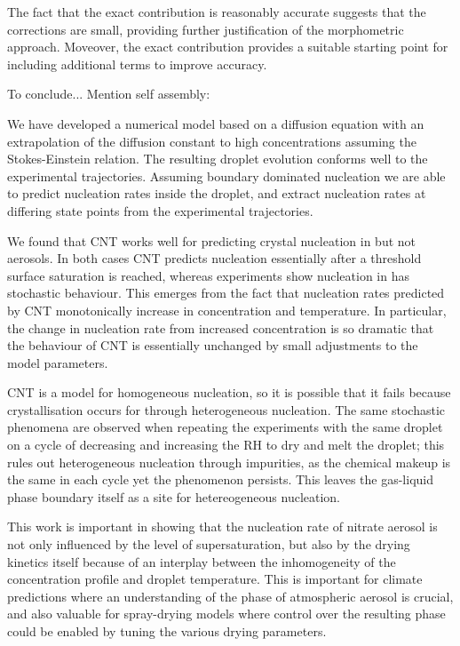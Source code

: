 \documentclass[11pt,twoside]{report}
\def\includebibliography{}
\begin{document}
The fact that the exact contribution is reasonably accurate suggests that the corrections are small, providing further justification of the morphometric approach.
Moveover, the exact contribution provides a suitable starting point for including additional terms to improve accuracy.

To conclude...
Mention self assembly: \cite{TeichNC2019}

We have developed a numerical model based on a diffusion equation with an extrapolation of the diffusion constant to high concentrations assuming the Stokes-Einstein relation.
The resulting droplet evolution conforms well to the experimental trajectories.
Assuming boundary dominated nucleation we are able to predict nucleation rates inside the droplet, and extract nucleation rates at differing state points from the experimental trajectories.

We found that CNT works well for predicting crystal nucleation in  but not  aerosols.
In both cases CNT predicts nucleation essentially after a threshold surface saturation is reached, whereas experiments show nucleation in  has stochastic behaviour.
This emerges from the fact that nucleation rates predicted by CNT monotonically increase in concentration and temperature.
In particular, the change in nucleation rate from increased concentration is so dramatic that the behaviour of CNT is essentially unchanged by small adjustments to the model parameters.

CNT is a model for homogeneous nucleation, so it is possible that it fails because crystallisation occurs for  through heterogeneous nucleation.
The same stochastic phenomena are observed when repeating the experiments with the same droplet on a cycle of decreasing and increasing the RH to dry and melt the droplet; this rules out heterogeneous nucleation through impurities, as the chemical makeup is the same in each cycle yet the phenomenon persists.
This leaves the gas-liquid phase boundary itself as a site for hetereogeneous nucleation.

This work is important in showing that the nucleation rate of nitrate aerosol is not only influenced by the level of supersaturation, but also by the drying kinetics itself because of an interplay between the inhomogeneity of the concentration profile and droplet temperature.
This is important for climate predictions where an understanding of the phase of atmospheric aerosol is crucial, and also valuable for spray-drying models where control over the resulting phase could be enabled by tuning the various drying parameters.

\ifdefined\includebibliography
  \printbibliography
\fi
\end{document}
